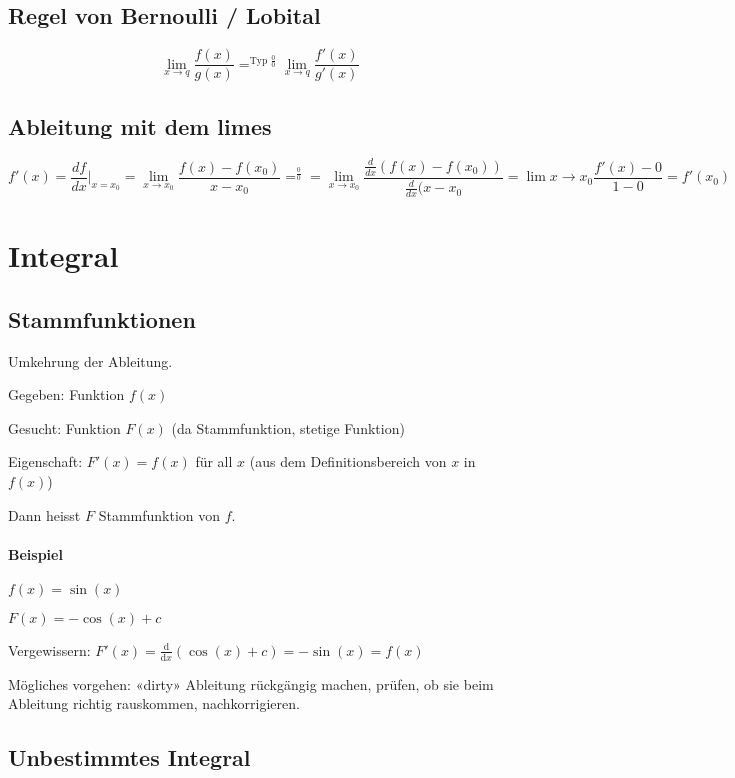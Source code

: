 \subsection{Regel von Bernoulli / Lobital}

\[
	\lim\limits_{x \to q} \frac{f(x)}{g(x)} =^{\text{Typ } \frac{0}{0}} \lim\limits_{x \to q} \frac{f'(x)}{g'(x)} %
\]


\subsection{Ableitung mit dem limes}

\[
	f'(x) = \frac{df}{dx}|_{x=x_0} = \lim\limits_{x \to x_0} \frac{f(x) - f(x_0)}{x - x_0} =^\frac{0}{0} = \lim\limits_{x \to x_0} \frac{\frac{d}{dx}(f(x) - f(x_0))}{\frac{d}{dx}(x - x_0} = \lim\limits{x \to x_0} \frac{f'(x) -0}{1 - 0} = f'(x_0)
\]

\section{Integral}

\subsection{Stammfunktionen}

Umkehrung der Ableitung.

Gegeben: Funktion $f(x)$

Gesucht: Funktion $F(x)$ (da Stammfunktion, stetige Funktion)

Eigenschaft: $F'(x) = f(x)$ für all $x$ (aus dem Definitionsbereich von $x$ in $f(x)$)

Dann heisst $F$ Stammfunktion von $f$.

\paragraph{Beispiel} \hfill

$f(x) = \sin(x)$

$F(x) = -\cos(x) + c$

Vergewissern: $F'(x) = \frac{\mathrm{d}}{\mathrm{d}x}(\cos(x) + c) = -\sin(x) = f(x)$

Mögliches vorgehen: «dirty» Ableitung rückgängig machen, prüfen, ob sie beim Ableitung richtig rauskommen, nachkorrigieren.

\subsection{Unbestimmtes Integral}

